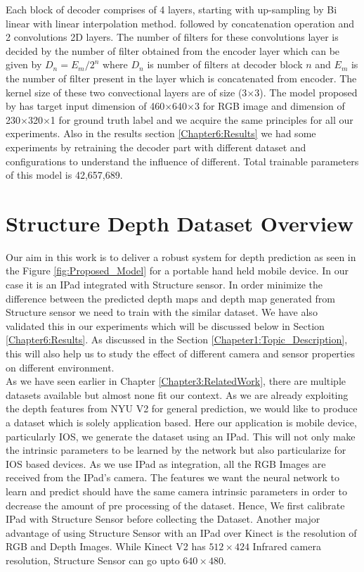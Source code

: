 Each block of decoder comprises of 4 layers, starting with up-sampling by Bi linear with linear interpolation method. followed by concatenation operation and 2 convolutions 2D layers. The number of filters for these convolutions layer is decided by the number of filter obtained from the encoder layer which can be given by \(D_n =  {E_m} / {2^n}\) where \(D_n\) is number of filters at decoder block \(n\) and \(E_m\) is the number of filter present in the layer which is concatenated from encoder. The kernel size of these two convectional layers are of size (3$\times$3). The model proposed by  \cite{Alhashim2018} has target input dimension of 460$\times$640$\times$3 for RGB image and  dimension of 230$\times$320$\times$1 for ground truth label and we acquire the same principles for all our experiments. Also in the results section \ref{Chapter6:Results} we had some experiments by retraining the decoder part with different dataset and configurations to understand the influence of different. Total trainable parameters of this model is 42,657,689.



\section{Structure Depth Dataset Overview} 
\label{Chapter4:Dataset} 

Our aim in this work is to deliver a robust system for depth prediction as seen in the Figure \ref{fig:Proposed_Model} for a portable hand held mobile device. In our case it is an IPad integrated with Structure sensor. In order minimize the difference between the predicted depth maps and depth map generated from Structure sensor we need to train with the similar dataset. We have also validated this in our experiments which will be discussed below in Section \ref{Chapter6:Results}. As discussed in the Section \ref{Chapeter1:Topic_Description}, this will also help us to study the effect of different camera and sensor properties on different environment.\\

As we have seen earlier in Chapter \ref{Chapter3:RelatedWork}, there are multiple datasets available but almost none fit our context. As we are already exploiting the depth features from NYU V2 for general prediction, we would like to produce a dataset which is solely application based. Here our application is mobile device, particularly IOS, we generate the dataset using an IPad. This will not only make the intrinsic parameters to be learned by the network but also particularize for IOS based devices. As we use IPad as integration, all the RGB Images are received from the IPad's camera. The features we want the neural network to learn and predict should have the same camera intrinsic parameters in order to decrease the amount of pre processing of the dataset. Hence, We first calibrate IPad with Structure Sensor before collecting the Dataset. Another major advantage of using Structure Sensor with an IPad over Kinect is the resolution of RGB and Depth Images. While Kinect V2 has $512\times424$ Infrared camera resolution, Structure Sensor can go upto $640\times480$. \\

